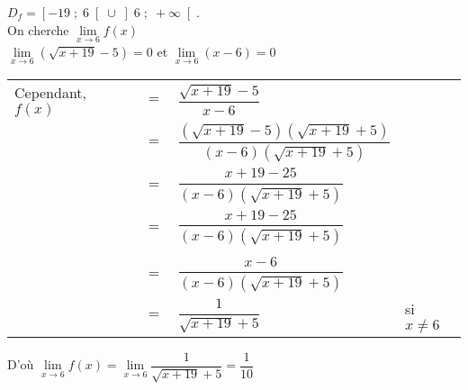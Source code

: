 $D_f = \left[-19 \; ; \; 6 \right[\cup \left]6 \; ; \; +\infty\right[$. \\

On cherche $\lim\limits_{x \to 6} f(x)$ \\

$\lim\limits_{x \to 6} \left(\sqrt{x + 19} - 5\right) = 0$ et $\lim\limits_{x \to 6} (x-6) = 0$ \\

\begin{tabular}{llll}
Cependant, $f(x)$ & $=$ & $\dfrac{\sqrt{x + 19} - 5}{x -6} $ & \vspace*{.3cm} \\
& $=$ & $\dfrac{\left(\sqrt{x + 19} - 5\right)\left(\sqrt{x + 19} + 5\right)}{\left(x-6\right)\left(\sqrt{x+19} + 5\right)}$ & \vspace*{.3cm} \\
& $=$ & $\dfrac{x + 19 - 25}{\left(x-6\right)\left(\sqrt{x+19} + 5\right)}$ & \vspace*{.3cm} \\
& $=$ & $\dfrac{x + 19 - 25}{\left(x-6\right)\left(\sqrt{x+19} + 5\right)}$ & \\
\vspace*{.3cm} \\
& $=$ & $\dfrac{x - 6}{\left(x-6\right)\left(\sqrt{x+19} + 5\right)}$ & \vspace*{.3cm} \\
& $=$ & $\dfrac{1}{\sqrt{x+19} + 5}$ & si $x \neq 6 $ \vspace*{.3cm} \\
\end{tabular}

D'où $\lim\limits_{x \to 6} f(x) = \lim\limits_{x \to 6} \dfrac{1}{\sqrt{x+19} + 5} = \dfrac{1}{10}$
